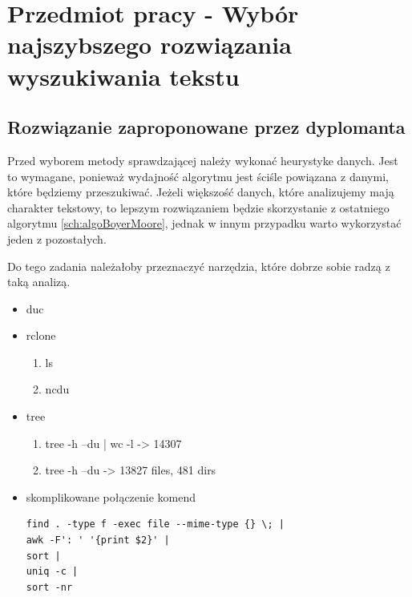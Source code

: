 \chapter{Przedmiot pracy - Wybór najszybszego rozwiązania wyszukiwania tekstu}


\section{Rozwiązanie zaproponowane przez dyplomanta}

Przed wyborem metody sprawdzającej należy wykonać heurystyke danych. Jest to 
wymagane, ponieważ wydajność algorytmu jest ściśle powiązana z danymi, które
będziemy przeszukiwać. Jeżeli większość danych, które analizujemy mają charakter
tekstowy, to lepszym rozwiązaniem będzie skorzystanie z ostatniego algorytmu
\ref{sch:algoBoyerMoore}, jednak w innym przypadku warto wykorzystać jeden z 
pozostałych.

Do tego zadania należałoby przeznaczyć narzędzia, które dobrze sobie radzą z 
taką analizą. 

\begin{itemize}
  \item duc
  \item rclone
  \begin{enumerate}
    \item ls 
    \item ncdu
  \end{enumerate}
  \item tree
  \begin{enumerate}
    \item tree -h --du | wc -l -> 14307
    \item tree -h --du -> 13827 files, 481 dirs
  \end{enumerate}
  \item skomplikowane połączenie komend
  \begin{verbatim}
find . -type f -exec file --mime-type {} \; |
awk -F': ' '{print $2}' |
sort |
uniq -c |
sort -nr
  \end{verbatim}
\end{itemize}

